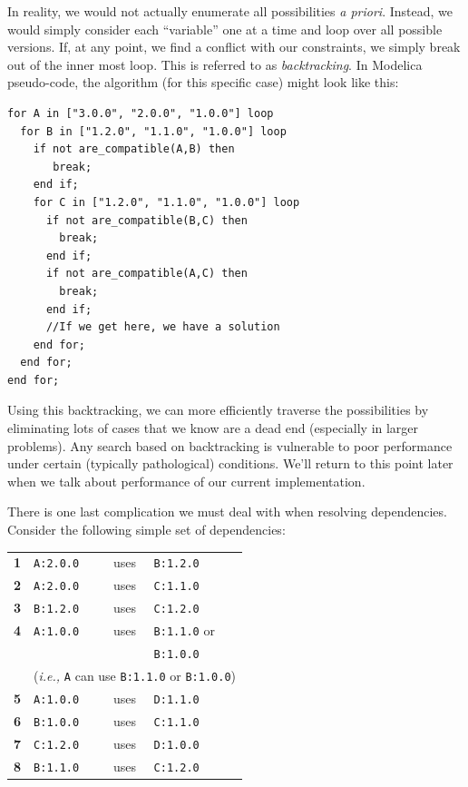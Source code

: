 \documentclass[11pt,a4paper,twocolumn]{article}
\renewcommand{\small}{\fontsize{9.5pt}{11.1pt}\selectfont}
\renewcommand{\footnotesize}{\fontsize{8.5pt}{9.9pt}\selectfont}
\newcommand{\code}[1]{\texttt{#1}} %
\begin{document}
In reality, we would not actually enumerate all possibilities
\emph{a priori}.  Instead, we would simply consider each ``variable'' one at
a time and loop over all possible versions.  If, at any point, we find
a conflict with our constraints, we simply break out of the inner most
loop.  This is referred to as \emph{backtracking}.  In Modelica
pseudo-code, the algorithm (for this specific case) might look like
this:

{\footnotesize
\begin{verbatim}
for A in ["3.0.0", "2.0.0", "1.0.0"] loop
  for B in ["1.2.0", "1.1.0", "1.0.0"] loop
    if not are_compatible(A,B) then
       break;
    end if;
    for C in ["1.2.0", "1.1.0", "1.0.0"] loop
      if not are_compatible(B,C) then
        break;
      end if;
      if not are_compatible(A,C) then
        break;
      end if;
      //If we get here, we have a solution
    end for;
  end for;
end for;
\end{verbatim}
}

Using this backtracking, we can more efficiently traverse the
possibilities by eliminating lots of cases that we know are a dead
end (especially in larger problems).  Any search based on backtracking
is vulnerable to poor performance under certain (typically
pathological) conditions.  We'll return to this point later when we
talk about performance of our current implementation.

There is one last complication we must deal with when resolving
dependencies.  Consider the following simple set of dependencies:
{\small
\begin{center}
\begin{tabular}{llcl}
  \textbf{1} &\code{A:2.0.0} &uses &\code{B:1.2.0}\\
  \textbf{2} &\code{A:2.0.0} &uses &\code{C:1.1.0}\\
  \textbf{3} &\code{B:1.2.0} &uses &\code{C:1.2.0}\\
  \textbf{4} &\code{A:1.0.0} &uses &\code{B:1.1.0} or\\
             &               &     &\code{B:1.0.0} \\
             & \multicolumn{3}{c}{(\emph{i.e.,} \code{A} can use \code{B:1.1.0} or \code{B:1.0.0})}\\
  \textbf{5} &\code{A:1.0.0} &uses &\code{D:1.1.0}\\
  \textbf{6} &\code{B:1.0.0} &uses &\code{C:1.1.0}\\
  \textbf{7} &\code{C:1.2.0} &uses &\code{D:1.0.0}\\
  \textbf{8} &\code{B:1.1.0} &uses &\code{C:1.2.0}
\end{tabular}
\end{center}
}
\end{document}
